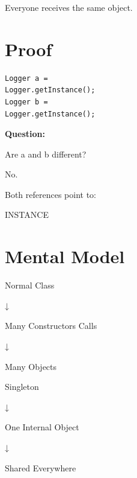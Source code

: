 \documentclass[11pt,a4paper]{book}
\begin{document}

Everyone receives the same object.


\section{Proof}

\begin{verbatim}
Logger a =
Logger.getInstance();
Logger b =
Logger.getInstance();
\end{verbatim}


\textbf{Question:}


Are a and b different?


No.


Both references point to:


INSTANCE


\section{Mental Model}

\begin{mentalmodel}

Normal Class

↓

Many Constructors Calls

↓

Many Objects

\vspace{0.5em}

Singleton

↓

One Internal Object

↓

Shared Everywhere

\end{mentalmodel}
\end{document}
